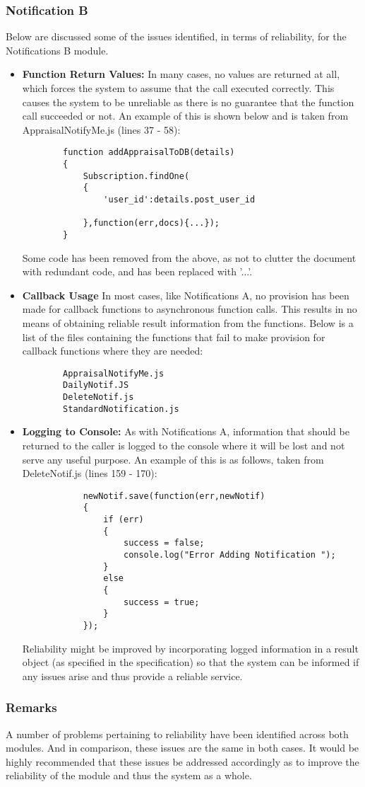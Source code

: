\subsubsection*{Notification B}
Below are discussed some of the issues identified, in terms of reliability, for the Notifications B module.
\begin{itemize}
	\item \textbf{Function Return Values:}\newline
	In many cases, no values are returned at all, which forces the system to assume that the call executed correctly. This causes the system to be unreliable as there is no guarantee that the function call succeeded or not. An example of this is shown below and is taken from AppraisalNotifyMe.js (lines 37 - 58): 
		\begin{lstlisting}
		function addAppraisalToDB(details)
		{
			Subscription.findOne(
			{
				'user_id':details.post_user_id
		
			},function(err,docs){...});
		}
		\end{lstlisting}
	Some code has been removed from the above, as not to clutter the document with redundant code, and has been replaced with '...'.
	\item \textbf{Callback Usage}\newline
	In most cases, like Notifications A, no provision has been made for callback functions to asynchronous function calls. This results in no means of obtaining reliable result information from the functions. Below is a list of the files containing the functions that fail to make provision for callback functions where they are needed:
		\begin{lstlisting}
		AppraisalNotifyMe.js
		DailyNotif.JS
		DeleteNotif.js
		StandardNotification.js
		\end{lstlisting}
	\item \textbf{Logging to Console:}\newline
	As with Notifications A, information that should be returned to the caller is logged to the console where it will be lost and not serve any useful purpose.
	An example of this is as follows, taken from DeleteNotif.js (lines 159 - 170):
		\begin{lstlisting}
			newNotif.save(function(err,newNotif)
			{
				if (err) 
				{
					success = false;
					console.log("Error Adding Notification ");
				}
				else 
				{
					success = true;
				}
			});
		\end{lstlisting}
	Reliability might be improved by incorporating logged information in a result object (as specified in the specification) so that the system can be informed if any issues arise and thus provide a reliable service.
\end{itemize}
\subsubsection*{Remarks}
A number of problems pertaining to reliability have been identified across both modules. And in comparison, these issues are the same in both cases. It would be highly recommended that these issues be addressed accordingly as to improve the reliability of the module and thus the system as a whole.